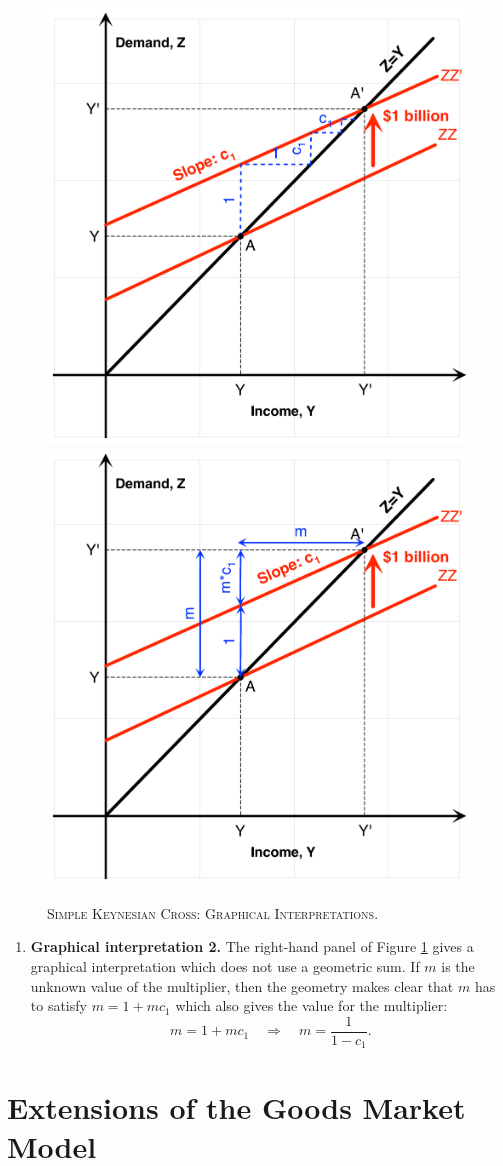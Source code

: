 \documentclass[]{book}
\providecommand{\tightlist}{%
  \setlength{\itemsep}{0pt}\setlength{\parskip}{0pt}}
\begin{document}
\begin{figure}

{\centering \includegraphics[width=0.49\linewidth,height=0.49\textheight]{graphsketcher/keynesian-cross} \includegraphics[width=0.49\linewidth,height=0.49\textheight]{graphsketcher/keynesian-cross2} 

}

\caption{\textsc{Simple Keynesian Cross: Graphical
Interpretations}.}\label{fig:keynes-graphical}
\end{figure}

\begin{enumerate}
\def\labelenumi{\arabic{enumi}.}
\setcounter{enumi}{3}
\tightlist
\item
  \textbf{Graphical interpretation 2.} The right-hand panel of Figure
  \ref{fig:keynes-graphical} gives a graphical interpretation which does
  not use a geometric sum. If \(m\) is the unknown value of the
  multiplier, then the geometry makes clear that \(m\) has to satisfy
  \(m=1+mc_{1}\) which also gives the value for the multiplier:
  \[m=1+mc_{1} \quad\Rightarrow\quad m=\frac{1}{1-c_{1}}.\]
\end{enumerate}

\section{Extensions of the Goods Market Model}\label{variations}
\end{document}
